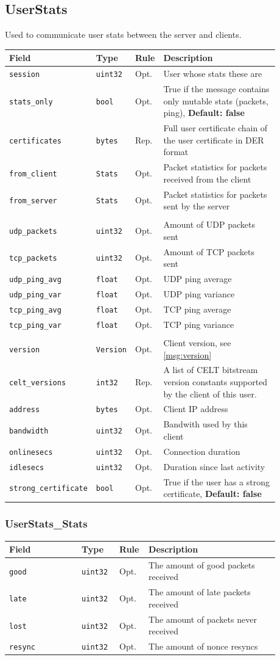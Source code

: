 \documentclass[11pt]{article} %
\newenvironment{mumbleMessageEx}
{%
	\small
	\renewcommand\arraystretch{1.5}
	\begin{tabular}{p{0.25\linewidth}p{0.13\linewidth}p{0.05\linewidth}p{0.45\linewidth}}
	Field & Type & Rule & Description \\
	\hline
}
{%
	\end{tabular}
	\renewcommand\arraystretch{1.0}
}
\newcommand{\mumbleMessageExItem}[4]{ \texttt{#1} & \texttt{#2} & #3 & #4 \\ }
\begin{document}
\subsection{UserStats}
\label{msg:userStats}

Used to communicate user stats between the server and clients.

\begin{mumbleMessageEx}
\mumbleMessageExItem{session}{uint32}{Opt.}{User whose stats these are}
\mumbleMessageExItem{stats\_only}{bool}{Opt.}{True if the message contains only mutable stats (packets, ping), \textbf{Default: false}}
\mumbleMessageExItem{certificates}{bytes}{Rep.}{Full user certificate chain of the user certificate in DER format} %
\mumbleMessageExItem{from\_client}{Stats}{Opt.}{Packet statistics for packets received from the client}
\mumbleMessageExItem{from\_server}{Stats}{Opt.}{Packet statistics for packets sent by the server}
\\
\mumbleMessageExItem{udp\_packets}{uint32}{Opt.}{Amount of UDP packets sent}
\mumbleMessageExItem{tcp\_packets}{uint32}{Opt.}{Amount of TCP packets sent}
\mumbleMessageExItem{udp\_ping\_avg}{float}{Opt.}{UDP ping average}
\mumbleMessageExItem{udp\_ping\_var}{float}{Opt.}{UDP ping variance}
\mumbleMessageExItem{tcp\_ping\_avg}{float}{Opt.}{TCP ping average}
\mumbleMessageExItem{tcp\_ping\_var}{float}{Opt.}{TCP ping variance}
\\
\mumbleMessageExItem{version}{Version}{Opt.}{Client version, see \ref{msg:version}}
\mumbleMessageExItem{celt\_versions}{int32}{Rep.}{A list of CELT bitstream version constants supported by the client of this user.}
\mumbleMessageExItem{address}{bytes}{Opt.}{Client IP address}
\mumbleMessageExItem{bandwidth}{uint32}{Opt.}{Bandwith used by this client}
\mumbleMessageExItem{onlinesecs}{uint32}{Opt.}{Connection duration}
\mumbleMessageExItem{idlesecs}{uint32}{Opt.}{Duration since last activity}
\mumbleMessageExItem{strong\_certificate}{bool}{Opt.}{True if the user has a strong certificate, \textbf{Default: false}}
\end{mumbleMessageEx}

\subsubsection{UserStats\_Stats}
\label{msg:userStats:stats}

\begin{mumbleMessageEx}
\mumbleMessageExItem{good}{uint32}{Opt.}{The amount of good packets received}
\mumbleMessageExItem{late}{uint32}{Opt.}{The amount of late packets received}
\mumbleMessageExItem{lost}{uint32}{Opt.}{The amount of packets never received}
\mumbleMessageExItem{resync}{uint32}{Opt.}{The amount of nonce resyncs}
\end{mumbleMessageEx}
\end{document}
